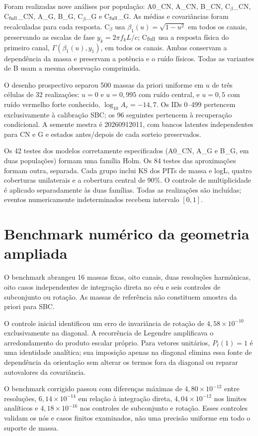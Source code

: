 Foram realizadas nove análises por população: A0\_CN, A\_CN, B\_CN, C$_\beta$\_CN, C$_{\rm full}$\_CN, A\_G, B\_G, C$_\beta$\_G e C$_{\rm full}$\_G. As médias e covariâncias foram recalculadas para cada resposta. C$_\beta$ usa $\beta_1(u)=\sqrt{1-u^2}$ em todos os canais, preservando as escalas de fase $y_k=2\pi f_kL/c$; C$_{\rm full}$ usa a resposta física do primeiro canal, $\Gamma(\beta_1(u),y_1)$, em todos os canais. Ambas conservam a dependência da massa e preservam a potência e o ruído físicos. Todas as variantes de B usam a mesma observação comprimida.

O desenho prospectivo separou 500 massas da priori uniforme em $u$ de três células de 32 realizações: $u=0$ e $u=0{,}995$ com ruído central, e $u=0{,}5$ com ruído vermelho forte conhecido, $\log_{10}A_r=-14{,}7$. Os IDs 0--499 pertencem exclusivamente à calibração SBC; os 96 seguintes pertencem à recuperação condicional. A semente mestra é 20260912011, com bancos latentes independentes para CN e G e estados antes/depois de cada sorteio preservados.

Os 42 testes dos modelos corretamente especificados (A0\_CN, A\_G e B\_G, em duas populações) formam uma família Holm. Os 84 testes das aproximações formam outra, separada. Cada grupo inclui KS dos PITs de massa e logL, quatro coberturas unilaterais e a cobertura central de 90\%. O controle de multiplicidade é aplicado separadamente às duas famílias. Todas as realizações são incluídas; eventos numericamente indeterminados recebem intervalo $[0,1]$.

\section{Benchmark numérico da geometria ampliada}

O benchmark abrangeu 16 massas fixas, oito canais, duas resoluções harmônicas, oito casos independentes de integração direta no céu e seis controles de subconjunto ou rotação. As massas de referência não constituem amostra da priori para SBC.

O controle inicial identificou um erro de invariância de rotação de $4{,}58\times10^{-10}$ exclusivamente na diagonal. A recorrência de Legendre amplificava o arredondamento do produto escalar próprio. Para vetores unitários, $P_\ell(1)=1$ é uma identidade analítica; sua imposição apenas na diagonal elimina essa fonte de dependência da orientação sem alterar os termos fora da diagonal ou reparar autovalores da covariância.

O benchmark corrigido passou com diferenças máximas de $4{,}80\times10^{-12}$ entre resoluções, $6{,}14\times10^{-14}$ em relação à integração direta, $4{,}04\times10^{-12}$ nos limites analíticos e $4{,}18\times10^{-16}$ nos controles de subconjunto e rotação. Esses controles validam os nós e casos finitos examinados, não uma precisão uniforme em todo o suporte de massa.

